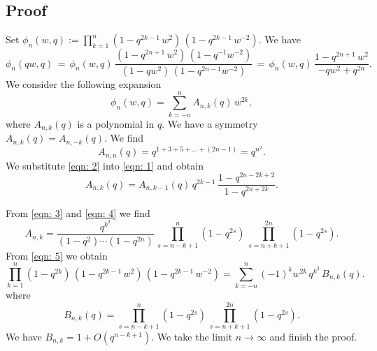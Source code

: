 \subsection{Proof}
Set
$
\phi_n(w,q):=\prod_{k=1}^n(1-q^{2k-1}\,w^2)\,(1-q^{2k-1}\,w^{-2}).
$
We have
\begin{equation}\label{eqn: 1}\phi_n(qw,q)\,=\,\phi_n(w,q)\,\frac{(1-q^{2n+1}\,w^2)\,(1-q^{-1}w^{-2})}
{(1-qw^2)\,(1-q^{2n-1}w^{-2})}\,=\,\phi_n(w,q)\,\frac{1-q^{2n+1}\,w^2}{-qw^2+q^{2n}}.
\end{equation}
We consider the following expansion
\begin{equation}\label{eqn: 2}
\phi_n(w,q)=\sum_{k=-n}^nA_{n,k}(q)\,w^{2k},
\end{equation}
where $A_{n,k}(q)$ is a polynomial in $q$. We have a symmetry $A_{n,k}(q)=A_{n,-k}(q)$.
We find
\begin{equation}\label{eqn: 3}
A_{n,n}(q)=q^{1+3+5+\ldots+(2n-1)}=q^{n^2}.
\end{equation}
We substitute \eqref{eqn: 2} into \eqref{eqn: 1} and obtain
\begin{equation}\label{eqn: 4}
A_{n,k}(q)=A_{n,k-1}(q)\,q^{2k-1}\,\frac{1-q^{2n-2k+2}}{1-q^{2n+2k}}.
\end{equation}

From \eqref{eqn: 3} and \eqref{eqn: 4} we find
\begin{equation}\label{eqn: 5}
A_{n,k}=\frac{q^{k^2}}{(1-q^2)\cdots(1-q^{2n})}\,\prod_{s=n-k+1}^n(1-q^{2s})\,\prod_{s=n+k+1}^{2n}(1-q^{2s}).
\end{equation}
From \eqref{eqn: 5} we obtain
$$\prod_{k=1}^n (1-q^{2k})\,(1-q^{2k-1}\,w^2)\,(1-q^{2k-1}\,w^{-2})=\sum_{k=-n}^n(-1)^k w^{2k}\,q^{k^2}\,B_{n,k}(q).$$
where
$$B_{n,k}(q)=\prod_{s=n-k+1}^n(1-q^{2s})\,\prod_{s=n+k+1}^{2n}(1-q^{2s}).$$
We have $B_{n,k}=1+O(q^{n-k+1})$.
We take the limit $n\to \infty$ and  finish the proof. 